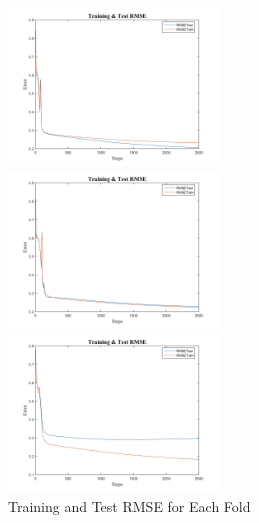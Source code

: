\documentclass[epsfig]{article}
\begin{document}
\begin{figure}[H]
	\caption{Training and Test RMSE for Each Fold}
	\begin{minipage}[t]{0.3\linewidth}
		\centering
		\includegraphics[width=2.2in]{RMSE_1.png}
		
		
	\end{minipage}%
	\begin{minipage}[t]{0.3\linewidth}
		\centering
		\includegraphics[width=2.2in]{RMSE_2.png}
		
		
	\end{minipage}
	\begin{minipage}[t]{0.3\linewidth}
		\centering
		\includegraphics[width=2.2in]{RMSE_3.png}
		
		
	\end{minipage}
\end{figure}
\end{document}
